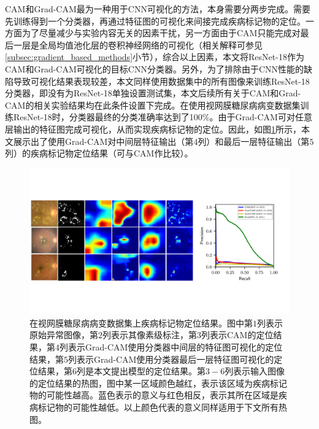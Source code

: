 CAM和Grad-CAM最为一种用于CNN可视化的方法，本身需要分两步完成。需要先训练得到一个分类器，再通过特征图的可视化来间接完成疾病标记物的定位。一方面为了尽量减少与实验内容无关的因素干扰，另一方面由于CAM只能完成对最后一层是全局均值池化层的卷积神经网络的可视化（相关解释可参见\ref{subsec:gradient_based_methods}小节），综合以上因素，本文将ResNet-18作为CAM和Grad-CAM可视化的目标CNN分类器。另外，为了排除由于CNN性能的缺陷导致可视化结果表现较差，本文同样使用数据集中的所有图像来训练ResNet-18分类器，即没有为ResNet-18单独设置测试集，本文后续所有关于CAM和Grad-CAM的相关实验结果均在此条件设置下完成。在使用视网膜糖尿病病变数据集训练ResNet-18时，分类器最终的分类准确率达到了100\%。由于Grad-CAM可对任意层输出的特征图完成可视化，从而实现疾病标记物的定位。因此，如图\ref{fig:retinal_image_res}所示，本文展示出了使用Grad-CAM对中间层特征输出（第$4$列）和最后一层特征输出（第$5$列）的疾病标记物定位结果（可与CAM作比较）。
\begin{figure}[h]
	\centering
	\includegraphics[width=1.0\textwidth]{figure/retinal_image_res.pdf}
	\caption{在视网膜糖尿病病变数据集上疾病标记物定位结果。图中第$1$列表示原始异常图像，第$2$列表示其像素级标注，第$3$列表示CAM的定位结果，第$4$列表示Grad-CAM使用分类器中间层的特征图可视化的定位结果，第$5$列表示Grad-CAM使用分类器最后一层特征图可视化的定位结果，第$6$列是本文提出模型的定位结果。第$3-6$列表示输入图像的定位结果的热图，图中某一区域颜色越红，表示该区域为疾病标记物的可能性越高。蓝色表示的意义与红色相反，表示其所在区域是疾病标记物的可能性越低。以上颜色代表的意义同样适用于下文所有热图。}
	\label{fig:retinal_image_res}
\end{figure}

